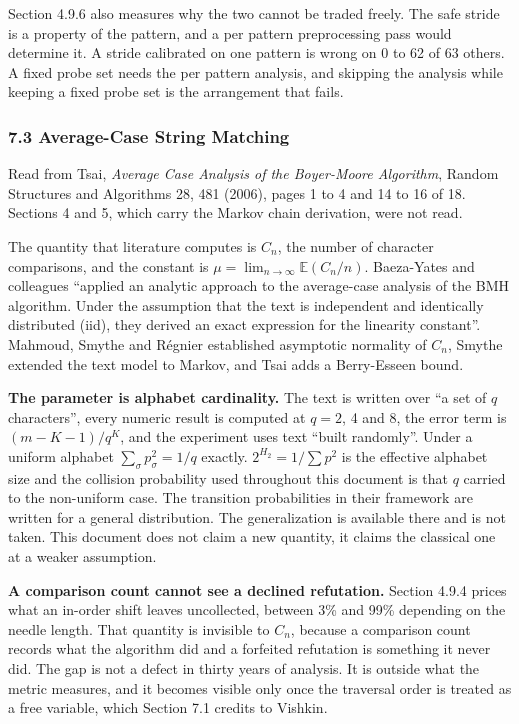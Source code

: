 Section 4.9.6 also measures why the two cannot be traded freely. The safe stride is a property of the pattern, and a per pattern preprocessing pass would determine it. A stride calibrated on one pattern is wrong on 0 to 62 of 63 others. A fixed probe set needs the per pattern analysis, and skipping the analysis while keeping a fixed probe set is the arrangement that fails.

\subsubsection{7.3 Average-Case String Matching}

Read from Tsai, \emph{Average Case Analysis of the Boyer-Moore Algorithm}, Random Structures and Algorithms 28, 481 (2006), pages 1 to 4 and 14 to 16 of 18. Sections 4 and 5, which carry the Markov chain derivation, were not read.

The quantity that literature computes is \(C_n\), the number of character comparisons, and the constant is \(\mu = \lim_{n\to\infty} \mathbb{E}(C_n/n)\). Baeza-Yates and colleagues ``applied an analytic approach to the average-case analysis of the BMH algorithm. Under the assumption that the text is independent and identically distributed (iid), they derived an exact expression for the linearity constant''. Mahmoud, Smythe and Régnier established asymptotic normality of \(C_n\), Smythe extended the text model to Markov, and Tsai adds a Berry-Esseen bound.

\noindent\textbf{The parameter is alphabet cardinality.} The text is written over ``a set of \(q\) characters'', every numeric result is computed at \(q = 2\), 4 and 8, the error term is \((m-K-1)/q^K\), and the experiment uses text ``built randomly''. Under a uniform alphabet \(\sum_\sigma p_\sigma^2 = 1/q\) exactly. \(2^{H_2} = 1/\sum p^2\) is the effective alphabet size and the collision probability used throughout this document is that \(q\) carried to the non-uniform case. The transition probabilities in their framework are written for a general distribution. The generalization is available there and is not taken. This document does not claim a new quantity, it claims the classical one at a weaker assumption.

\noindent\textbf{A comparison count cannot see a declined refutation.} Section 4.9.4 prices what an in-order shift leaves uncollected, between 3\% and 99\% depending on the needle length. That quantity is invisible to \(C_n\), because a comparison count records what the algorithm did and a forfeited refutation is something it never did. The gap is not a defect in thirty years of analysis. It is outside what the metric measures, and it becomes visible only once the traversal order is treated as a free variable, which Section 7.1 credits to Vishkin.


